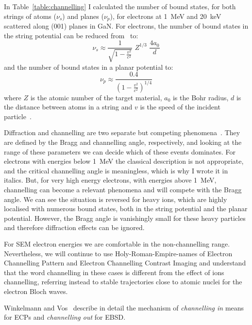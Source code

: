 In Table~\ref{table:channelling} I calculated the number of bound states, for both strings of atoms ($\nu_s$) and planes ($\nu_p$), for electrons at \SI{1}{\mega \electronvolt} and \SI{20}{\kilo \electronvolt} scattered along \hkl(001) planes in GaN. For electrons, the number of bound states in the string potential can be reduced from~\cite{Lindhard65} to:
\begin{equation*}
\nu_s \approx \frac{1}{\sqrt{1-\frac{v^2}{c^2}}}\,\, Z^{1/3} \,\, \frac{4a_0}{d}
\end{equation*}
and the number of bound states in a planar potential to:
\begin{equation*}
\nu_p \approx \frac{0.4}{(1-\frac{v^2}{c^2})^{1/4}} 
\end{equation*}
where $Z$ is the atomic number of the target material, $a_0$ is the Bohr radius, $d$ is the distance between atoms in a string and $v$ is the speed of the incident particle~\cite{Uggerhoj69}.  

Diffraction and channelling are two separate but competing phenomena~\cite{Chadderton70}. They are defined by the Bragg and channelling angle, respectively, and looking at the range of these parameters we can decide which of these events dominates. For electrons with energies below \SI{1}{\mega \electronvolt} the classical description is not appropriate, and the critical channelling angle is meaningless, which is why I wrote it in italics. But, for very high energy electrons, with energies above \SI{1}{\mega \electronvolt}, channelling can become a relevant phenomena and will compete with the Bragg angle. We can see the situation is reversed for heavy ions, which are highly localised with numerous bound states, both in the string potential and the planar potential. However, the Bragg angle is vanishingly small for these heavy particles and therefore diffraction effects can be ignored. 

For SEM electron energies we are comfortable in the non-channelling range. Nevertheless, we will continue to use Holy-Roman-Empire-names of Electron Channelling Pattern and Electron Channelling Contrast Imaging and understand that the word channelling in these cases is different from the effect of ions channelling, referring instead to stable trajectories close to atomic nuclei for the electron Bloch waves. 



Winkelmann and Vos~\cite{Winkelmann13} describe in detail the mechanism of \textit{channelling in} means for ECPs and \textit{channelling out} for EBSD.




